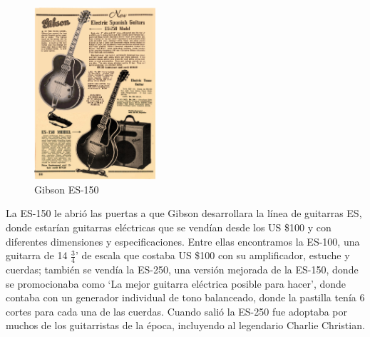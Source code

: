 \documentclass{article}
\begin{document}
\begin{figure}
    \centering
    \includegraphics[width=0.4\textwidth]{images/promo.jpg}
    \vspace{-5pt}
    \caption{Gibson ES-150}
\end{figure}

La ES-150 le abrió las puertas a que Gibson desarrollara la línea de guitarras ES, donde estarían guitarras eléctricas que se vendían desde los US \$100 y con diferentes dimensiones y especificaciones. Entre ellas encontramos la ES-100, una guitarra de 14 \(\frac{3}{4}\)' de escala que costaba US \$100 con su amplificador, estuche y cuerdas; también se vendía la ES-250, una versión mejorada de la ES-150, donde se promocionaba como ‘La mejor guitarra eléctrica posible para hacer’, donde contaba con un generador individual de tono balanceado, donde la pastilla tenía 6 cortes para cada una de las cuerdas. Cuando salió la ES-250 fue adoptaba por muchos de los guitarristas de la época, incluyendo al legendario Charlie Christian.\nocite{*}

\endgroup

\printbibliography[
title={Bibliografía}
]
\end{document}
